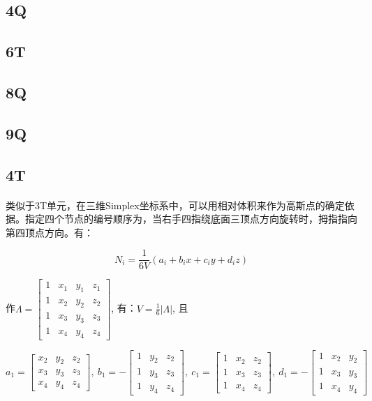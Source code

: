 \documentclass[UTF8]{ctexbook}
\begin{document}
\subsection{4Q}

\subsection{6T}

\subsection{8Q}

\subsection{9Q}

\subsection{4T}
\paragraph{}
类似于3T单元，在三维Simplex坐标系中，可以用相对体积来作为高斯点的确定依据。指定四个节点的编号顺序为，当右手四指绕底面三顶点方向旋转时，拇指指向第四顶点方向。有：

\[
N_{i}=\frac{1}{6V}(a_{i}+b_{i}x+c_{i}y+d_{i}z)
\]


作$\Lambda=\left[\begin{array}{cccc}
1 & x_{1} & y_{1} & z_{1}\\
1 & x_{2} & y_{2} & z_{2}\\
1 & x_{3} & y_{3} & z_{3}\\
1 & x_{4} & y_{4} & z_{4}
\end{array}\right]$, 有：$V=\frac{1}{6}|\Lambda|$, 且

\[
a_{1}=\left[\begin{array}{ccc}
x_{2} & y_{2} & z_{2}\\
x_{3} & y_{3} & z_{3}\\
x_{4} & y_{4} & z_{4}
\end{array}\right],\ b_{1}=-\left[\begin{array}{ccc}
1 & y_{2} & z_{2}\\
1 & y_{3} & z_{3}\\
1 & y_{4} & z_{4}
\end{array}\right],\ c_{1}=\left[\begin{array}{ccc}
1 & x_{2} & z_{2}\\
1 & x_{3} & z_{3}\\
1 & x_{4} & z_{4}
\end{array}\right],\ d_{1}=-\left[\begin{array}{ccc}
1 & x_{2} & y_{2}\\
1 & x_{3} & y_{3}\\
1 & x_{4} & y_{4}
\end{array}\right]
\]
\end{document}
